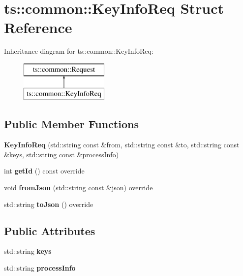 \hypertarget{structts_1_1common_1_1_key_info_req}{}\section{ts\+:\+:common\+:\+:Key\+Info\+Req Struct Reference}
\label{structts_1_1common_1_1_key_info_req}
Inheritance diagram for ts\+:\+:common\+:\+:Key\+Info\+Req\+:\begin{figure}[H]
\begin{center}
\leavevmode
\includegraphics[height=2.000000cm]{structts_1_1common_1_1_key_info_req}
\end{center}
\end{figure}
\subsection*{Public Member Functions}
\begin{DoxyCompactItemize}
\item 
\mbox{\label{structts_1_1common_1_1_key_info_req_a53639a1233c987a687a953f28b65a3f4}} 
{\bfseries Key\+Info\+Req} (std\+::string const \&from, std\+::string const \&to, std\+::string const \&keys, std\+::string const \&process\+Info)
\item 
\mbox{\label{structts_1_1common_1_1_key_info_req_a01d7af709eca139df7e0fc42540aa31c}} 
int {\bfseries get\+Id} () const override
\item 
\mbox{\label{structts_1_1common_1_1_key_info_req_a69aeb081d361836cf8d4e6fabb7d6812}} 
void {\bfseries from\+Json} (std\+::string const \&json) override
\item 
\mbox{\label{structts_1_1common_1_1_key_info_req_af6dde21ab32464de8dd56ab41895046e}} 
std\+::string {\bfseries to\+Json} () override
\end{DoxyCompactItemize}
\subsection*{Public Attributes}
\begin{DoxyCompactItemize}
\item 
\mbox{\label{structts_1_1common_1_1_key_info_req_aa1b2351c9e16670d8482e84095ff9f63}} 
std\+::string {\bfseries keys}
\item 
\mbox{\label{structts_1_1common_1_1_key_info_req_adbeedc415e2c74202a14ace7e836f605}} 
std\+::string {\bfseries process\+Info}
\end{DoxyCompactItemize}
